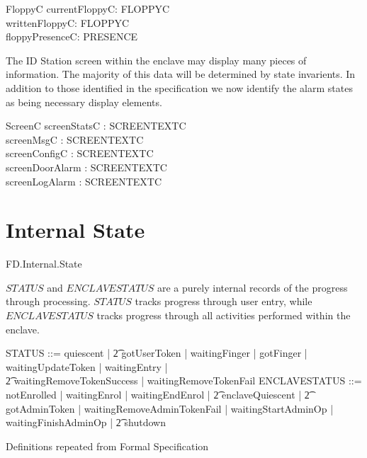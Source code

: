 \begin{schema}{FloppyC}
	currentFloppyC: FLOPPYC
\\      writtenFloppyC: FLOPPYC
\\	floppyPresenceC: PRESENCE
\end{schema}

The ID Station screen within the enclave may display many pieces of
information. The majority of this data will be determined by state
invarients.
In addition to those identified in the specification we now identify
the alarm states as being necessary display elements.

\begin{schema}{ScreenC}
        screenStatsC : SCREENTEXTC
\\      screenMsgC : SCREENTEXTC
\\      screenConfigC : SCREENTEXTC
\\      screenDoorAlarm : SCREENTEXTC
\\      screenLogAlarm : SCREENTEXTC 
\end{schema}

\section{Internal State}

\begin{traceunit}{FD.Internal.State}
\end{traceunit}


$STATUS$ and $ENCLAVESTATUS$ are a purely internal records of the progress through 
processing. $STATUS$ tracks progress through user entry, while
$ENCLAVESTATUS$ tracks progress through all activities performed
within the enclave. 

\begin{zed}
	STATUS ::= quiescent | 
\also \t2          gotUserToken |  waitingFinger | gotFinger | waitingUpdateToken | waitingEntry |
\\ \t2          waitingRemoveTokenSuccess | waitingRemoveTokenFail 
\also
        ENCLAVESTATUS ::= notEnrolled | waitingEnrol | waitingEndEnrol |
\also \t2          enclaveQuiescent |
\also \t2          gotAdminToken | waitingRemoveAdminTokenFail |
waitingStartAdminOp | waitingFinishAdminOp |
\also \t2          shutdown 
\end{zed}
\begin{Zcomment}
\item Definitions repeated from Formal Specification \cite{FS}
\end{Zcomment}

